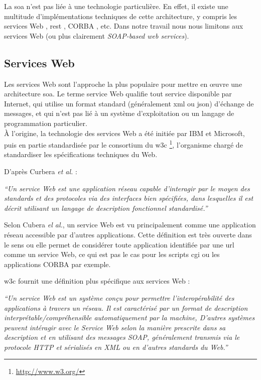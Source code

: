   La \acrshort{soa} n'est pas liée à une technologie particulière. En
  effet, il existe une multitude d'implémentations techniques de cette
  architecture, y compris les services Web \cite{WSA}, \acrshort{rest}
  \cite{fielding2000architectural}, \textsc{CORBA}
  \cite{vinoski1997corba}, etc. Dans notre travail nous nous
  limitons aux services Web (ou plus clairement
  \textit{SOAP-based web services}).

  \subsection{Services Web}
  \label{sec:ws-def}
  Les services Web sont l'approche la plus populaire pour mettre en
  œuvre une architecture \acrshort{soa}. Le terme service Web qualifie
  tout service disponible par Internet, qui utilise un format standard
  (généralement \acrshort{xml} ou \acrshort{json}) d'échange de
  messages, et qui n'est pas lié à un système d'exploitation ou un
  langage de programmation particulier.\\

  À l'origine, la technologie des services Web a été initiée par IBM
  \cite{kreger2001web} et Microsoft, puis en partie standardisée par
  le consortium du \acrshort{w3c} \footnote{\url{http://www.w3.org/}},
  l'organisme chargé de standardiser les spécifications techniques du
  Web.\medskip

  D'après Curbera \emph{et al.} \cite{curbera2001web}:\bigskip

  \textit{``Un service Web est une application réseau capable d'interagir
    par le moyen des standards et des protocoles via des interfaces
    bien spécifiées, dans lesquelles il est décrit utilisant un langage de
    description fonctionnel standardisé.''}\bigskip

  Selon Cubera \emph{el al.}, un service Web est vu principalement
  comme une application réseau accessible par d'autres
  applications. Cette définition est très ouverte dans le sens ou elle
  permet de considérer toute application identifiée par une \acrshort{url}
  comme un service Web, ce qui est pas le cas pour les scripts \acrshort{cgi} ou les applications
  \textsc{CORBA} par exemple.\medskip

  \acrshort{w3c} fournit une définition plus spécifique aux services
  Web \cite{WSA}:\bigskip

  \textit{``Un service Web est un système conçu pour permettre
    l'interopérabilité des applications à travers un réseau.  Il est
    caractérisé par un format de description
    interprétable/compréhensible automatiquement par la machine,
    D'autres systèmes peuvent intéragir avec le Service Web selon la
    manière prescrite dans sa description et en utilisant des messages
    SOAP, généralement transmis via le protocole HTTP et sérialisés en
    XML ou en d'autres standards du Web.''} \bigskip

